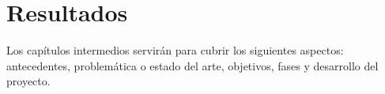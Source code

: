 \chapter{Resultados}
\label{cap:4-resultados}

Los capítulos intermedios servirán para cubrir los siguientes aspectos:
antecedentes, problemática o estado del arte, objetivos, fases y desarrollo del proyecto.


